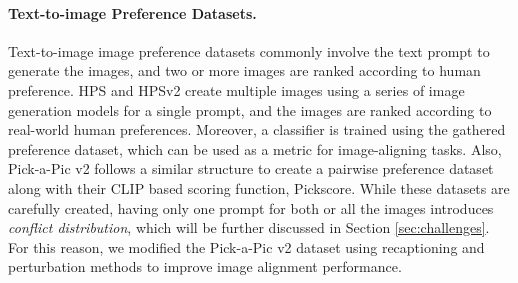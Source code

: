 \paragraph{Text-to-image Preference Datasets.} Text-to-image image preference datasets commonly involve the text prompt to generate the images, and two or more images are ranked according to human preference. HPS \citep{wu2023human1} and HPSv2 \citep{wu2023human2} create multiple images using a series of image generation models for a single prompt, and the images are ranked according to real-world human preferences. Moreover, a classifier is trained using the gathered preference dataset, which can be used as a metric for image-aligning tasks. Also, Pick-a-Pic v2 \citep{kirstain2023pickapic} follows a similar structure to create a pairwise preference dataset along with their CLIP \citep{radford2021learningtransferablevisualmodels} based scoring function, Pickscore. While these datasets are carefully created, having only one prompt for both or all the images introduces \textit{conflict distribution}, which will be further discussed in Section \ref{sec:challenges}. For this reason, we modified the Pick-a-Pic v2 dataset using recaptioning and perturbation methods to improve image alignment performance. 